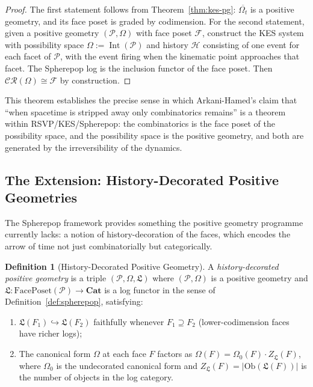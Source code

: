 \documentclass[12pt, oneside]{amsart}
\theoremstyle{plain}
\theoremstyle{definition}
\newtheorem{definition}[theorem]{Definition}
\theoremstyle{remark}
\DeclareMathOperator{\Int}{Int}
\newcommand{\OmKS}{\Omega}
\newcommand{\HKS}{\mathcal{H}}
\newcommand{\Log}{\mathfrak{L}}
\newcommand{\CF}{\Omega}   %
\begin{document}
\begin{proof}
The first statement follows from Theorem~\ref{thm:kes-pg}: $\overline{\OmKS_t}$ is a positive geometry, and its face poset is graded by codimension. For the second statement, given a positive geometry $(\mathcal{P}, \CF)$ with face poset $\mathcal{F}$, construct the KES system with possibility space $\OmKS := \Int(\mathcal{P})$ and history $\HKS$ consisting of one event for each facet of $\mathcal{P}$, with the event firing when the kinematic point approaches that facet. The Spherepop log is the inclusion functor of the face poset. Then $\mathcal{CR}(\OmKS) \cong \mathcal{F}$ by construction.
\end{proof}

This theorem establishes the precise sense in which Arkani-Hamed's claim that ``when spacetime is stripped away only combinatorics remains'' is a theorem within RSVP/KES/Spherepop: the combinatorics is the face poset of the possibility space, and the possibility space is the positive geometry, and both are generated by the irreversibility of the dynamics.

\subsection{The Extension: History-Decorated Positive Geometries}

The Spherepop framework provides something the positive geometry programme currently lacks: a notion of history-decoration of the faces, which encodes the arrow of time not just combinatorially but categorically.

\begin{definition}[History-Decorated Positive Geometry]
\label{def:history-pg}
A \emph{history-decorated positive geometry} is a triple $(\mathcal{P}, \CF, \Log)$ where $(\mathcal{P}, \CF)$ is a positive geometry and $\Log: \text{FacePoset}(\mathcal{P}) \to \mathbf{Cat}$ is a log functor in the sense of Definition~\ref{def:spherepop}, satisfying:
\begin{enumerate}[label=(\roman*)]
  \item $\Log(F_1) \hookrightarrow \Log(F_2)$ faithfully whenever $F_1 \supseteq F_2$ (lower-codimension faces have richer logs);
  \item The canonical form $\CF$ at each face $F$ factors as $\CF(F) = \CF_0(F) \cdot Z_{\Log}(F)$, where $\CF_0$ is the undecorated canonical form and $Z_{\Log}(F) = |\text{Ob}(\Log(F))|$ is the number of objects in the log category.
\end{enumerate}
\end{definition}
\end{document}
